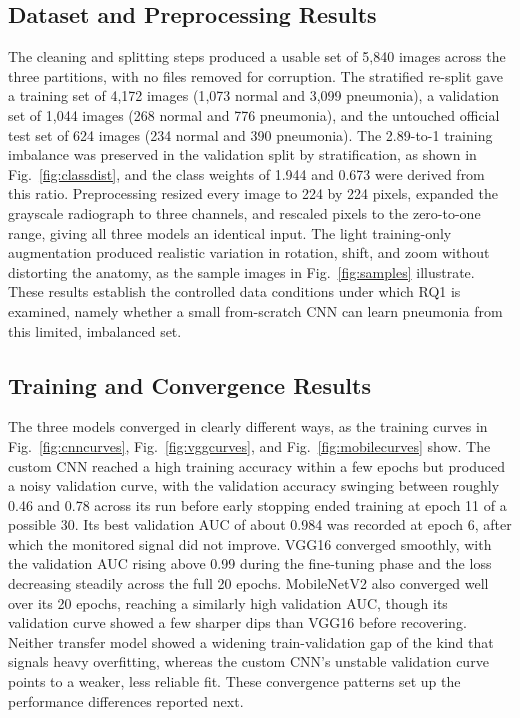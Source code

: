 \documentclass[preprint,12pt]{elsarticle}
\begin{document}
\subsection{Dataset and Preprocessing Results}
The cleaning and splitting steps produced a usable set of 5{,}840 images across the three partitions, with no files removed for corruption.
The stratified re-split gave a training set of 4{,}172 images (1{,}073 normal and 3{,}099 pneumonia), a validation set of 1{,}044 images (268 normal and 776 pneumonia), and the untouched official test set of 624 images (234 normal and 390 pneumonia).
The 2.89-to-1 training imbalance was preserved in the validation split by stratification, as shown in Fig.~\ref{fig:classdist}, and the class weights of 1.944 and 0.673 were derived from this ratio.
Preprocessing resized every image to 224 by 224 pixels, expanded the grayscale radiograph to three channels, and rescaled pixels to the zero-to-one range, giving all three models an identical input.
The light training-only augmentation produced realistic variation in rotation, shift, and zoom without distorting the anatomy, as the sample images in Fig.~\ref{fig:samples} illustrate.
These results establish the controlled data conditions under which RQ1 is examined, namely whether a small from-scratch CNN can learn pneumonia from this limited, imbalanced set.

\subsection{Training and Convergence Results}
The three models converged in clearly different ways, as the training curves in Fig.~\ref{fig:cnncurves}, Fig.~\ref{fig:vggcurves}, and Fig.~\ref{fig:mobilecurves} show.
The custom CNN reached a high training accuracy within a few epochs but produced a noisy validation curve, with the validation accuracy swinging between roughly 0.46 and 0.78 across its run before early stopping ended training at epoch 11 of a possible 30.
Its best validation AUC of about 0.984 was recorded at epoch 6, after which the monitored signal did not improve.
VGG16 converged smoothly, with the validation AUC rising above 0.99 during the fine-tuning phase and the loss decreasing steadily across the full 20 epochs.
MobileNetV2 also converged well over its 20 epochs, reaching a similarly high validation AUC, though its validation curve showed a few sharper dips than VGG16 before recovering.
Neither transfer model showed a widening train-validation gap of the kind that signals heavy overfitting, whereas the custom CNN's unstable validation curve points to a weaker, less reliable fit.
These convergence patterns set up the performance differences reported next.
\end{document}
